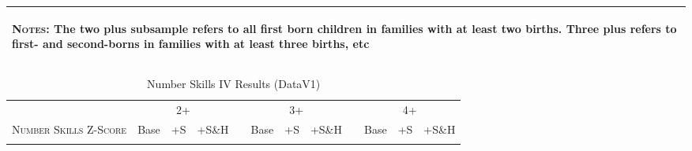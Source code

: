 \begin{landscape}
\begin{table}[htpb!]
\begin{center}
\begin{tabular}{lcccp{2mm}cccp{2mm}ccc}
\midrule\multicolumn{12}{p{19.2cm}}{\begin{footnotesize}\textsc{Notes:} The two plus subsample refers to all first born children in families with at least two births.  Three plus refers to first- and second-borns in families with at least three births, etc\end{footnotesize}} \\ \bottomrule 
\end{tabular}\end{center}\end{table}\end{landscape}\begin{landscape}\begin{table}[htpb!]\caption{Number Skills IV Results (DataV1)}
\label{TWINtab:IVAll}
\begin{center}\begin{tabular}{lcccp{2mm}cccp{2mm}ccc}
\toprule \toprule 
&\multicolumn{3}{c}{2+}&&\multicolumn{3}{c}{3+}&&\multicolumn{3}{c}{4+}\\ \cmidrule(r){2-4} \cmidrule(r){6-8} \cmidrule(r){10-12} 
\textsc{Number Skills Z-Score}&Base&+S&+S\&H&&Base&+S&+S\&H&&Base&+S&+S\&H\\ \midrule 
\begin{footnotesize}\end{footnotesize}& 
\begin{footnotesize}\end{footnotesize}& 
\begin{footnotesize}\end{footnotesize}& 
\begin{footnotesize}\end{footnotesize}& 
\begin{footnotesize}\end{footnotesize}& 
\begin{footnotesize}\end{footnotesize}& 
\begin{footnotesize}\end{footnotesize}& 
\begin{footnotesize}\end{footnotesize}& 
\begin{footnotesize}\end{footnotesize}& 
\begin{footnotesize}\end{footnotesize}& 
\begin{footnotesize}\end{footnotesize}& 
\begin{footnotesize}\end{footnotesize}\\ 

\end{tabular}
\end{center}
\end{table}
\end{landscape}
